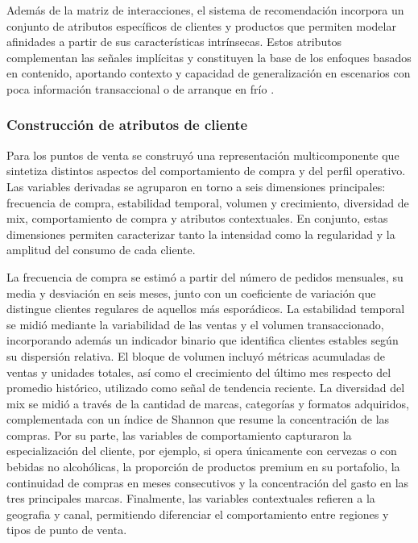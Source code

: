Además de la matriz de interacciones, el sistema de recomendación incorpora un conjunto de atributos específicos de clientes y productos que permiten modelar afinidades a partir de sus características intrínsecas. Estos atributos complementan las señales implícitas y constituyen la base de los enfoques basados en contenido, aportando contexto y capacidad de generalización en escenarios con poca información transaccional o de arranque en frío \cite{BOOK:Ricci2015,BOOK:Aggarwal2016}.

\subsubsection{Construcción de atributos de cliente}

Para los puntos de venta se construyó una representación multicomponente que sintetiza distintos aspectos del comportamiento de compra y del perfil operativo. Las variables derivadas se agruparon en torno a seis dimensiones principales: frecuencia de compra, estabilidad temporal, volumen y crecimiento, diversidad de mix, comportamiento de compra y atributos contextuales. En conjunto, estas dimensiones permiten caracterizar tanto la intensidad como la regularidad y la amplitud del consumo de cada cliente.

La frecuencia de compra se estimó a partir del número de pedidos mensuales, su media y desviación en seis meses, junto con un coeficiente de variación que distingue clientes regulares de aquellos más esporádicos. La estabilidad temporal se midió mediante la variabilidad de las ventas y el volumen transaccionado, incorporando además un indicador binario que identifica clientes estables según su dispersión relativa. El bloque de volumen incluyó métricas acumuladas de ventas y unidades totales, así como el crecimiento del último mes respecto del promedio histórico, utilizado como señal de tendencia reciente. La diversidad del mix se midió a través de la cantidad de marcas, categorías y formatos adquiridos, complementada con un índice de Shannon \cite{ARTICLE:Shannon1948} que resume la concentración de las compras. Por su parte, las variables de comportamiento capturaron la especialización del cliente, por ejemplo, si opera únicamente con cervezas o con bebidas no alcohólicas, la proporción de productos premium en su portafolio, la continuidad de compras en meses consecutivos y la concentración del gasto en las tres principales marcas. Finalmente, las variables contextuales refieren a la geografia y canal, permitiendo diferenciar el comportamiento entre regiones y tipos de punto de venta.

